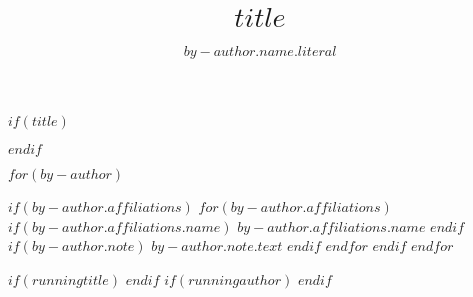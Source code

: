 $if(title)$
\title{$title$}
$endif$

$for(by-author)$
  \author{$by-author.name.literal$}{%
  $if(by-author.affiliations)$
    $for(by-author.affiliations)$
      $if(by-author.affiliations.name)$
         $by-author.affiliations.name$
      $endif$
  }{%
      $if(by-author.note)$
          $by-author.note.text$
      $endif$
  }
    $endfor$
  $endif$
$endfor$

$if(runningtitle)$
$endif$
$if(runningauthor)$
$endif$ 